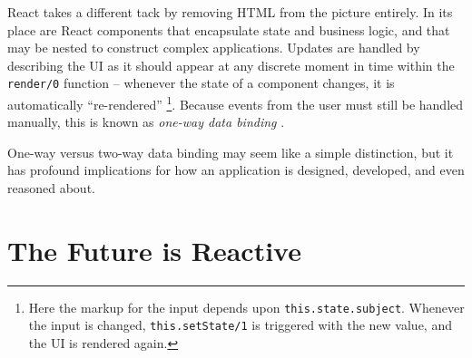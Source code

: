 \documentclass[12pt,letterpaper]{article}
\begin{document}
React takes a different tack by removing HTML from the picture entirely. In its place are React components that encapsulate state and business logic, and that may be nested to construct complex applications. Updates are handled by describing the UI as it should appear at any discrete moment in time within the \texttt{render/0} function -- whenever the state of a component changes, it is automatically ``re-rendered'' \footnote{Here the markup for the input depends upon \texttt{this.state.subject}. Whenever the input is changed, \texttt{this.setState/1} is triggered with the new value, and the UI is rendered again.}. Because events from the user must still be handled manually, this is known as \emph{one-way data binding} \cite{Hunt:2014}.




One-way versus two-way data binding may seem like a simple distinction, but it has profound implications for how an application is designed, developed, and even reasoned about.













\section{The Future is Reactive}
\vspace{-12pt}
\end{document}
